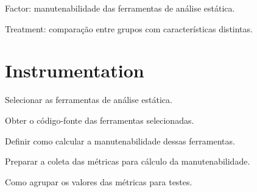 Factor: manutenabilidade das ferramentas de análise estática.

Treatment: comparação entre grupos com características distintas.

\section{Instrumentation}

Selecionar as ferramentas de análise estática.

Obter o código-fonte das ferramentas selecionadas.

Definir como calcular a manutenabilidade dessas ferramentas.

Preparar a coleta das métricas para cálculo da manutenabilidade.

Como agrupar os valores das métricas para testes.
